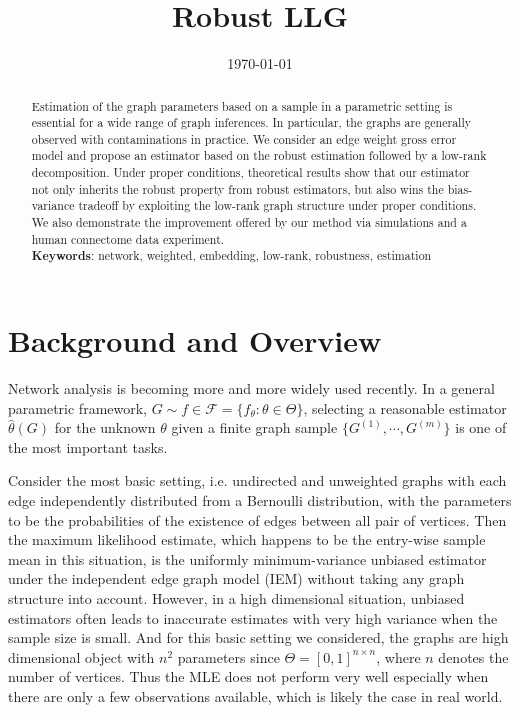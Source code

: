\documentclass[a4paper]{article}
\title{Robust LLG}
\date{\today}
\renewcommand{\hat}{\widehat}
\begin{document}
\maketitle

\begin{abstract}
Estimation of the graph parameters based on a sample in a parametric setting is essential for a wide range of graph inferences. In particular, the graphs are generally observed with contaminations in practice. We consider an edge weight gross error model and propose an estimator based on the robust estimation followed by a low-rank decomposition. Under proper conditions, theoretical results show that our estimator not only inherits the robust property from robust estimators, but also wins the bias-variance tradeoff by exploiting the low-rank graph structure under proper conditions. We also demonstrate the improvement offered by our method via simulations and a human connectome data experiment. \\
{\bf Keywords}: network, weighted, embedding, low-rank, robustness, estimation
\end{abstract}


\section{Background and Overview}

Network analysis is becoming more and more widely used recently. In a general parametric framework, $G \sim f \in \mathcal{F} = \{f_{\theta} : \theta \in \Theta \}$, selecting a reasonable estimator $\hat{\theta}(G)$ for the unknown $\theta$ given a finite graph sample $\{G^{(1)}, \cdots, G^{(m)}\}$ is one of the most important tasks.

Consider the most basic setting, i.e. undirected and unweighted graphs with each edge independently distributed from a Bernoulli distribution, with the parameters to be the probabilities of the existence of edges between all pair of vertices.
Then the maximum likelihood estimate, which happens to be the entry-wise sample mean in this situation, is the uniformly minimum-variance unbiased estimator under the independent edge graph model (IEM) \citep{bollobas2007phase} without taking any graph structure into account. 
However, in a high dimensional situation, unbiased estimators often leads to inaccurate estimates with very high variance when the sample size is small. And for this basic setting we considered, the graphs are high dimensional object with $n^2$ parameters since $\Theta = [0, 1]^{n\times n}$, where $n$ denotes the number of vertices. Thus the MLE does not perform very well especially when there are only a few observations available, which is likely the case in real world.
\end{document}

